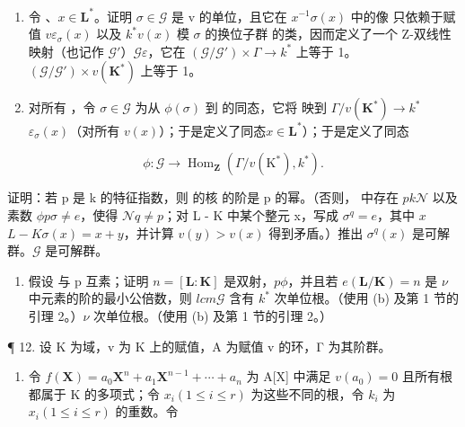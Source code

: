 \begin{enumerate}
\def\labelenumi{(\alph{enumi})}
\item
  令 、\(x \in \mathbf{L}^*\)。证明 \(\sigma \in \mathcal{G}\) 是 v 的单位，且它在 \(x^{-1}\sigma(x)\) 中的像  只依赖于赋值 \(v\)\(\varepsilon_{\sigma}(x)\) 以及 \(k^*\)\(v(x)\) 模 \(\sigma\) 的换位子群  的类，因而定义了一个 Z-双线性映射（也记作 \(\mathcal{G}'\)）\(\mathcal{G}\)\(\varepsilon\)，它在 \((\mathcal{G}/\mathcal{G}') \times \Gamma \to k^*\) 上等于 1。\((\mathcal{G}/\mathcal{G}') \times v(\mathbf{K}^*)\) 上等于 1。
\item
  对所有 ，令 \(\sigma \in \mathcal{G}\) 为从 \(\phi(\sigma)\) 到  的同态，它将  映到 \(\Gamma / v(\mathbf{K}^*) \to k^*\)\(\varepsilon_{\sigma}(x)\)（对所有 \(v(x)\)）；于是定义了同态\(x \in \mathbf{L}^*\)）；于是定义了同态
\end{enumerate}

\[
\phi \colon \mathcal {G} \to \operatorname{Hom} _ {\mathbf {Z}} (\Gamma / v (\mathrm{K} ^ {*}), k ^ {*}).
\]

证明：若 p 是 k 的特征指数，则  的核  的阶是 p 的幂。（否则， 中存在 \(p\)\(k\)\(\mathcal{N}\) 以及素数 \(\phi\)\(p\)\(\sigma \neq e\)，使得 \(\mathcal{N}\)\(q \neq p\)；对 L - K 中某个整元 x，写成 \(\sigma^q = e\)，其中 \(x\)\(L - K\)\(\sigma(x) = x + y\)，并计算 \(v(y) > v(x)\) 得到矛盾。）推出 \(\sigma^q(x)\) 是可解群。\(\mathcal{G}\) 是可解群。

\begin{enumerate}
\def\labelenumi{(\alph{enumi})}
\setcounter{enumi}{2}
\tightlist
\item
  假设  与 p 互素；证明 \(n = [\mathbf{L} : \mathbf{K}]\) 是双射，\(p\)\(\phi\)，并且若 \(e(\mathbf{L} / \mathbf{K}) = n\) 是 \(\nu\) 中元素的阶的最小公倍数，则 \(lcm\)\(\mathcal{G}\) 含有 \(k^*\) 次单位根。（使用 (b) 及第 1 节的引理 2。）\(\nu\) 次单位根。（使用 (b) 及第 1 节的引理 2。）
\end{enumerate}

¶ 12. 设 K 为域，v 为 K 上的赋值，A 为赋值 v 的环，Γ 为其阶群。

\begin{enumerate}
\def\labelenumi{(\alph{enumi})}
\tightlist
\item
  令 \(f(\mathbf{X}) = a_{0}\mathbf{X}^{n} + a_{1}\mathbf{X}^{n-1} + \cdots + a_{n}\) 为 A{[}X{]} 中满足 \(v(a_{0}) = 0\) 且所有根都属于 K 的多项式；令 \(x_{i} (1 \leqslant i \leqslant r)\) 为这些不同的根，令 \(k_{i}\) 为 \(x_{i} (1 \leqslant i \leqslant r)\) 的重数。令
\end{enumerate}

